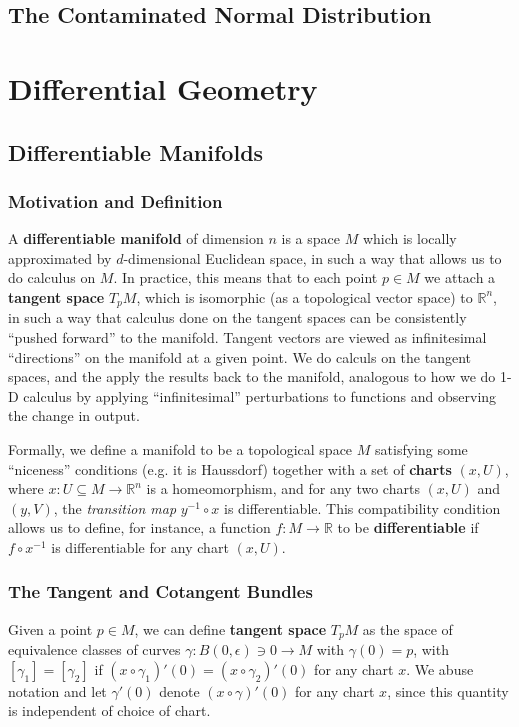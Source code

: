 \documentclass[reqno]{amsart}
\numberwithin{equation}{section}
\begin{document}
\subsection{The Contaminated Normal Distribution}

\section{Differential Geometry}
\subsection{Differentiable Manifolds}
\subsubsection{Motivation and Definition}
A \textbf{differentiable manifold} of dimension $n$ is a space $M$ which is locally approximated by $d$-dimensional
Euclidean space, in such a way that allows us to do calculus on $M$. In practice, this means that to each point
$p \in M$ we attach a \textbf{tangent space} $T_pM$, which is isomorphic (as a topological vector space) to
$\mathbb R^n$, in such a way that calculus done on the tangent spaces can be consistently ``pushed forward'' to
the manifold. Tangent vectors are viewed as infinitesimal ``directions'' on the manifold at a given point.
We do calculs on the tangent spaces, and the apply the results back to the manifold, analogous
to how we do 1-D calculus by applying ``infinitesimal'' perturbations to functions and observing the change in output.

Formally, we define a manifold to be a topological space $M$ satisfying some ``niceness'' conditions
(e.g. it is Haussdorf) together with a set of \textbf{charts} $(x, U)$, where $x : U \subseteq M \to \mathbb R^n$
is a homeomorphism, and for any two charts $(x, U)$ and $(y, V)$, the \emph{transition map}
$y^{-1} \circ x$ is differentiable. This compatibility condition allows us to define, for
instance, a function $f: M \to \mathbb R$ to be \textbf{differentiable} if $f \circ x^{-1}$ is differentiable for
any chart $(x, U)$.

\subsubsection{The Tangent and Cotangent Bundles}

Given a point $p \in M$, we can define \textbf{tangent space} $T_pM$
as the space of equivalence classes of curves $\gamma : B(0, \epsilon) \ni 0 \to M$ with
$\gamma(0) = p$, with $[\gamma_1] = [\gamma_2]$ if $(x \circ \gamma_1)'(0) = (x \circ \gamma_2)'(0)$
for any chart $x$. We abuse notation and let $\gamma'(0)$ denote $(x \circ \gamma)'(0)$ for any chart $x$,
since this quantity is independent of choice of chart.
\end{document}
